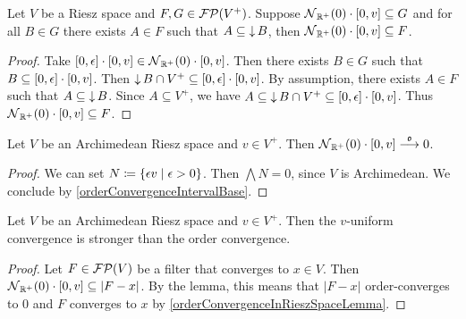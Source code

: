 \begin{lemma} \label{filterGreaterThanRieszUniformNeighbourhoodLemma}
Let $V$ be a Riesz space and $F,G\in\operatorname{\mathcal{FP}}(V^+)$. Suppose $\neighbourhood_{\R^+}(0)\cdot \interval{0,v} \subseteq G$ and for all $B\in G$ there exists $A\in F$ such that $A\subseteq \operatorname{\downarrow} B$, then $\neighbourhood_{\R^+}(0)\cdot \interval{0,v} \subseteq F$.
\end{lemma}
\begin{proof}
Take $\interval{0,\epsilon} \cdot \interval{0,v} \in \neighbourhood_{\R^+}(0)\cdot \interval{0,v}$. Then there exists $B\in G$ such that $B\subseteq \interval{0,\epsilon} \cdot \interval{0,v}$. Then $\downset B \cap V^+ \subseteq \interval{0,\epsilon} \cdot \interval{0,v}$. By assumption, there exists $A\in F$ such that $A\subseteq \operatorname{\downarrow} B$. Since $A\subseteq V^+$, we have $A\subseteq \downset B \cap V^+ \subseteq \interval{0,\epsilon} \cdot \interval{0,v}$. Thus $\neighbourhood_{\R^+}(0)\cdot \interval{0,v} \subseteq F$.
\end{proof}

\begin{lemma}
Let $V$ be an Archimedean Riesz space and $v\in V^+$. Then $\neighbourhood_{\R^+}(0)\cdot \interval{0,v} \overset{\mathfrak{o}}{\longrightarrow} 0$.
\end{lemma}
\begin{proof}
We can set $N \defeq \setbuilder{\epsilon v}{\epsilon > 0}$. Then $\bigwedge N = 0$, since $V$ is Archimedean. We conclude by \ref{orderConvergenceIntervalBase}.
\end{proof}
\begin{corollary}
Let $V$ be an Archimedean Riesz space and $v\in V^+$. Then the $v$-uniform convergence is stronger than the order convergence.
\end{corollary}
\begin{proof}
Let $F\in \operatorname{\mathcal{FP}}(V)$ be a filter that converges to $x\in V$. Then $\neighbourhood_{\R^+}(0)\cdot \interval{0,v} \subseteq |F - x|$. By the lemma, this means that $|F-x|$ order-converges to $0$ and $F$ converges to $x$ by \ref{orderConvergenceInRieszSpaceLemma}.
\end{proof}

